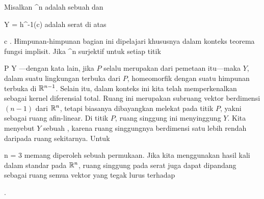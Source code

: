 \setcounter{section}{1}


Misalkan
 {\R^n } { \R
} {}
adalah sebuah
dan

\mavergleichskette
{\vergleichskette
{ Y
}
{ = }{ h^{-1}(c)
}
{  }{
}
{    }{
}
{   }{
}
}
{}{}{}
adalah serat di atas

\mavergleichskette
{\vergleichskette
{ c
}
{ \in }{ \R
}
{  }{
}
{    }{
}
{   }{
}
}
{}{}{.}
Himpunan-himpunan bagian ini dipelajari khususnya dalam konteks teorema fungsi implisit. Jika
 {\R^n } { \R
} {}
surjektif untuk setiap titik

\mavergleichskette
{\vergleichskette
{ P
}
{ \in }{ Y
}
{  }{
}
{    }{
}
{   }{
}
}
{}{}{}
---dengan kata lain, jika $P$ selalu merupakan
dari pemetaan itu---maka $Y$, dalam suatu lingkungan terbuka dari $P$, homeomorfik dengan suatu himpunan terbuka di ${\mathbb R}^{n-1}$. Selain itu, dalam konteks ini kita telah memperkenalkan
sebagai kernel diferensial total. Ruang ini merupakan subruang vektor berdimensi $(n-1 )$ dari ${\mathbb R}^n$, tetapi biasanya dibayangkan melekat pada titik $P$, yakni sebagai ruang afin-linear. Di titik $P$, ruang singgung ini menyinggung $Y$. Kita menyebut $Y$ sebuah  {,} karena ruang singgungnya berdimensi satu lebih rendah daripada ruang sekitarnya. Untuk

\mavergleichskette
{\vergleichskette
{ n
}
{ = }{ 3
}
{  }{
}
{    }{
}
{   }{
}
}
{}{}{}
memang diperoleh sebuah permukaan. Jika kita menggunakan hasil kali dalam standar pada ${\mathbb R}^n$, ruang singgung pada serat juga dapat dipandang sebagai ruang semua vektor yang tegak lurus terhadap

.

